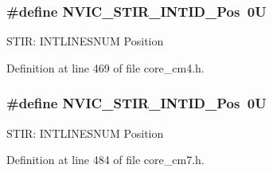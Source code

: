 \subsubsection[{\texorpdfstring{N\+V\+I\+C\+\_\+\+S\+T\+I\+R\+\_\+\+I\+N\+T\+I\+D\+\_\+\+Pos}{NVIC_STIR_INTID_Pos}}]{\setlength{\rightskip}{0pt plus 5cm}\#define N\+V\+I\+C\+\_\+\+S\+T\+I\+R\+\_\+\+I\+N\+T\+I\+D\+\_\+\+Pos~0U}\hypertarget{group___c_m_s_i_s___n_v_i_c_ga9eebe495e2e48d302211108837a2b3e8}{}\label{group___c_m_s_i_s___n_v_i_c_ga9eebe495e2e48d302211108837a2b3e8}
S\+T\+IR\+: I\+N\+T\+L\+I\+N\+E\+S\+N\+UM Position 

Definition at line 469 of file core\+\_\+cm4.\+h.

\subsubsection[{\texorpdfstring{N\+V\+I\+C\+\_\+\+S\+T\+I\+R\+\_\+\+I\+N\+T\+I\+D\+\_\+\+Pos}{NVIC_STIR_INTID_Pos}}]{\setlength{\rightskip}{0pt plus 5cm}\#define N\+V\+I\+C\+\_\+\+S\+T\+I\+R\+\_\+\+I\+N\+T\+I\+D\+\_\+\+Pos~0U}\hypertarget{group___c_m_s_i_s___n_v_i_c_ga9eebe495e2e48d302211108837a2b3e8}{}\label{group___c_m_s_i_s___n_v_i_c_ga9eebe495e2e48d302211108837a2b3e8}
S\+T\+IR\+: I\+N\+T\+L\+I\+N\+E\+S\+N\+UM Position 

Definition at line 484 of file core\+\_\+cm7.\+h.

